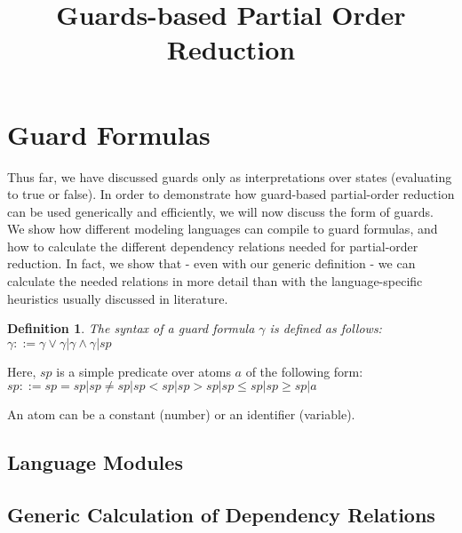 \documentclass{paper}
\title{Guards-based Partial Order Reduction}
\subtitle{}
\newtheorem{definition}{Definition}
\begin{document}
\maketitle
\thispagestyle{empty} 

\section{Guard Formulas}

Thus far, we have discussed guards only as interpretations over states 
(evaluating to true or false). In order to demonstrate how
guard-based partial-order reduction can be used generically and 
efficiently, we will now discuss the form of guards.
We show how different modeling languages can compile to guard formulas, 
and how to calculate the different dependency relations needed for 
partial-order reduction. In fact, we show that - even with our generic 
definition - we can calculate the needed relations in more detail than
with the language-specific heuristics usually discussed in literature.

\begin{definition}
The syntax of a guard formula $\gamma$ is defined as follows:\label{}\\	
$\gamma ::= \gamma\lor\gamma | \gamma\land\gamma | sp$
\end{definition}

Here, $sp$ is a simple predicate over atoms $a$ of the following form:\label{}\\
$sp ::= sp=sp | sp\neq sp | sp<sp | sp > sp | sp\le sp | sp\ge sp | a$

An atom can be a constant (number) or an identifier (variable).


\subsection{Language Modules}

\subsection{Generic Calculation of Dependency Relations}
\newpage

\newcommand\promela{\textsc{Promela}\xspace}
\newcommand\pins{\textsc{Pins}\xspace}

\newcommand\guards{\ensuremath{\mathcal{G}}\xspace}
\newcommand\actions{\ensuremath{\mathcal{A}}\xspace}
\newcommand\trans{\ensuremath{\mathcal{T}}\xspace}
\newcommand\bool{\ensuremath{\mathbb{B}}\xspace}
\newcommand\writeset{\ensuremath{\mathcal{W}}\xspace}
\newcommand\readset{\ensuremath{\mathcal{R}}\xspace}
\newcommand\MC{\ensuremath{\mathcal{MC}}\xspace}
\newcommand\NES{\ensuremath{\mathcal{NES}}\xspace}
\newcommand\NDS{\ensuremath{\mathcal{NDS}}\xspace}
\end{document}
